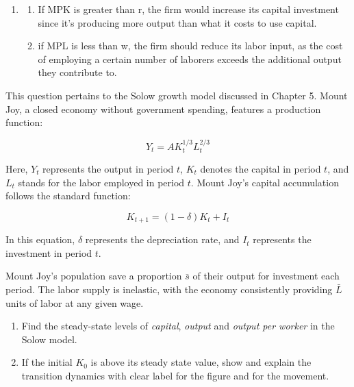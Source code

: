 \documentclass[addpoints,ngerman,12pt,answers]{exam}
\begin{document}
\begin{questions}
\begin{solution}
\begin{enumerate}[label=(\alph*)]
				At optimal, the firm would choose $MPK=r$ and $MPL=w$, which
				\[\alpha A K^{\alpha - 1} L^{1-\alpha} = r\]
				\[(1-\alpha) A K^{\alpha} L^{-\alpha} = w\]
				\item 
				\begin{enumerate}[label=(\roman*)]
					\item If MPK is greater than r,  the firm would increase its capital investment since it's producing more output than what it costs to use capital.
					\item if MPL is less than w, the firm should reduce its labor input, as the cost of employing a certain number of laborers exceeds the additional output they contribute to.
				\end{enumerate}
			\end{enumerate}
		\end{solution}		
%		
		\clearpage
		\question This question pertains to the Solow growth model discussed in Chapter 5. Mount Joy, a closed economy without government spending, features a production function:
		
		\[Y_t = A K_t^{1/3} L_t^{2/3}\]
		
		Here, \(Y_t\) represents the output in period \(t\), \(K_t\) denotes the capital in period \(t\), and \(L_t\) stands for the labor employed in period \(t\). Mount Joy's capital accumulation follows the standard function:
		
		\[K_{t+1} = (1 - \delta) K_t + I_t\]
		
		In this equation, \(\delta\) represents the depreciation rate, and \(I_t\) represents the investment in period \(t\).
		
		Mount Joy's population save a proportion \(\bar{s}\) of their output for investment each period. The labor supply is inelastic, with the economy consistently providing \(\bar{L}\) units of labor at any given wage.
		\begin{enumerate}[label=(\alph*)]
			\item Find the steady-state levels of \textit{capital}, \textit{output} and \textit{output per worker} in the Solow model.
			\item If the initial $K_0$ is above its steady state value, show and explain the transition dynamics with clear label for the figure and for the movement.
		\end{enumerate}
		

\end{questions}
\end{document}
